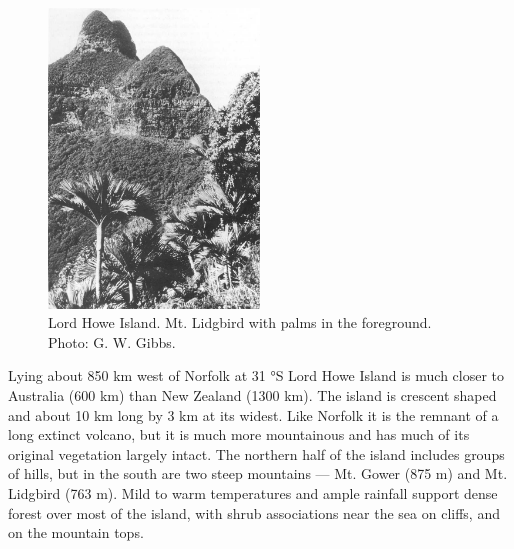 \begin{figure}
	\includegraphics[width=0.5\textwidth]{graphics/figure120lord-howe-island.jpg}
	\centering
	\caption[Lord Howe Island]{Lord Howe Island.
	Mt. Lidgbird with  palms in the foreground.
	Photo: G. W. Gibbs.}%
	\label{fig:120lord-howe-island}
\end{figure}

Lying about 850 km west of Norfolk at 31 °S Lord Howe Island is much closer to Australia (600 km) than New Zealand (1300 km).
The island is crescent shaped and about 10 km long by 3 km at its widest.
Like Norfolk it is the remnant of a long extinct volcano, but it is much more mountainous and has much of its original vegetation largely intact.
The northern half of the island includes groups of hills, but in the south are two steep mountains --- Mt.
Gower (875 m) and Mt.
Lidgbird (763 m).
Mild to warm temperatures and ample rainfall support dense forest over most of the island, with shrub associations near the sea on cliffs, and on the mountain tops.

